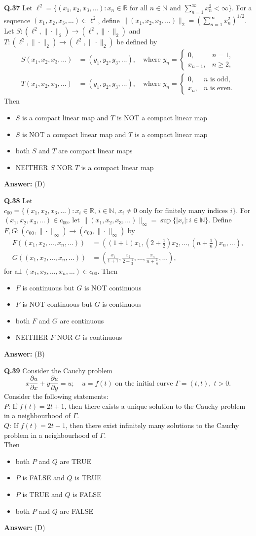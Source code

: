 \documentclass[11pt,a4paper]{article}
\newcommand{\optslistA}[4]{%
  \begin{itemize}
    \setlength{\itemsep}{2pt}\setlength{\parskip}{0pt}
    \item[(A)] #1
    \item[(B)] #2
    \item[(C)] #3
    \item[(D)] #4
  \end{itemize}%
}
\newcommand{\ans}[1]{\textbf{Answer:} #1\par\medskip}
\begin{document}
\textbf{Q.37} Let $\ell^2 = \{(x_1, x_2, x_3, \ldots) : x_n \in \mathbb{R} \text{ for all } n \in \mathbb{N} \text{ and } \sum_{n=1}^{\infty} x_n^2 < \infty\}$. For a sequence $(x_1, x_2, x_3, \ldots) \in \ell^2$, define $\|(x_1, x_2, x_3, \ldots)\|_2 = \left(\sum_{n=1}^{\infty} x_n^2\right)^{1/2}$. Let $S : (\ell^2, \|\cdot\|_2) \to (\ell^2, \|\cdot\|_2)$ and $T : (\ell^2, \|\cdot\|_2) \to (\ell^2, \|\cdot\|_2)$ be defined by
\begin{align*}
  S(x_1, x_2, x_3, \ldots) &= (y_1, y_2, y_3, \ldots), \quad \text{where } y_n = \begin{cases} 0, & n = 1, \\ x_{n-1}, & n \ge 2, \end{cases} \\
  T(x_1, x_2, x_3, \ldots) &= (y_1, y_2, y_3, \ldots), \quad \text{where } y_n = \begin{cases} 0, & n \text{ is odd}, \\ x_n, & n \text{ is even}. \end{cases}
\end{align*}
Then
\optslistA{$S$ is a compact linear map and $T$ is NOT a compact linear map}{$S$ is NOT a compact linear map and $T$ is a compact linear map}{both $S$ and $T$ are compact linear maps}{NEITHER $S$ NOR $T$ is a compact linear map}
\ans{(D)}

\textbf{Q.38} Let $c_{00} = \{(x_1, x_2, x_3, \ldots) : x_i \in \mathbb{R}, \, i \in \mathbb{N}, \, x_i \ne 0 \text{ only for finitely many indices } i\}$. For $(x_1, x_2, x_3, \ldots) \in c_{00}$, let $\|(x_1, x_2, x_3, \ldots)\|_\infty = \sup\{|x_i| : i \in \mathbb{N}\}$. Define $F, G : (c_{00}, \|\cdot\|_\infty) \to (c_{00}, \|\cdot\|_\infty)$ by
\begin{align*}
  F((x_1, x_2, \ldots, x_n, \ldots)) &= \left((1 + 1)x_1, \left(2 + \frac{1}{2}\right)x_2, \ldots, \left(n + \frac{1}{n}\right)x_n, \ldots\right), \\
  G((x_1, x_2, \ldots, x_n, \ldots)) &= \left(\frac{x_1}{1 + 1}, \frac{x_2}{2 + \frac{1}{2}}, \ldots, \frac{x_n}{n + \frac{1}{n}}, \ldots\right),
\end{align*}
for all $(x_1, x_2, \ldots, x_n, \ldots) \in c_{00}$. Then
\optslistA{$F$ is continuous but $G$ is NOT continuous}{$F$ is NOT continuous but $G$ is continuous}{both $F$ and $G$ are continuous}{NEITHER $F$ NOR $G$ is continuous}
\ans{(B)}

\textbf{Q.39} Consider the Cauchy problem
\[
  x \frac{\partial u}{\partial x} + y \frac{\partial u}{\partial y} = u; \quad u = f(t) \text{ on the initial curve } \Gamma = (t, t), \; t > 0.
\]
Consider the following statements:\\
$P$: If $f(t) = 2t + 1$, then there exists a unique solution to the Cauchy problem in a neighbourhood of $\Gamma$.\\
$Q$: If $f(t) = 2t - 1$, then there exist infinitely many solutions to the Cauchy problem in a neighbourhood of $\Gamma$.\\
Then
\optslistA{both $P$ and $Q$ are TRUE}{$P$ is FALSE and $Q$ is TRUE}{$P$ is TRUE and $Q$ is FALSE}{both $P$ and $Q$ are FALSE}
\ans{(D)}
\end{document}
